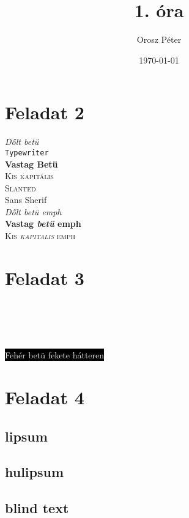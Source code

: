 \documentclass[a4paper,11pt]{article}
\title{1. óra}
\author{Orosz Péter}
\date{\today}
\begin{document}
	\maketitle
	\section{Feladat 2}
		\textit{Dőlt betü}\\
		\texttt{Typewriter}\\
		\textbf{Vastag Betü}\\
		\textsc{Kis kapitális}\\
		\textsc{Slanted}\\
		\textsf{Sans Sherif}\\
		\textit{Dőlt \emph{betü} emph}\\
		\textbf{Vastag \emph{betü} emph}\\
		\textsc{Kis \emph{kapitalis} emph}
		
	\section{Feladat 3}
		\\
		\scalebox{-1.0}{\scalebox{2.0}{Vízszintes tükrözés}}\\
		\\
		\\
		\colorbox{black}{\textcolor{white}{Fehér betü fekete hátteren}}\\
	
	\pagebreak
	\section{Feladat 4}
		\subsection{lipsum}
			\textbf{\lipsum[1]}
		\subsection{hulipsum}
			\begin{flushright}
				\hulipsum[1]
			\end{flushright}
		\subsection{blind text}
			\linespread{2}
			\selectfont
			\blindtext[1]
\end{document}
